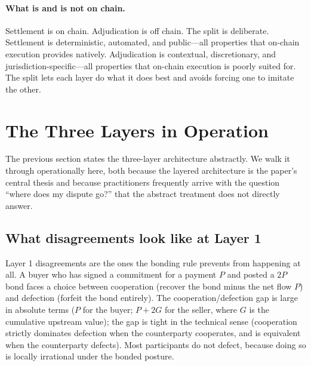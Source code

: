 \documentclass[11pt,a4paper]{article}
\theoremstyle{remark}
\begin{document}
\paragraph{What is and is not on chain.}
Settlement is on chain. Adjudication is off chain. The split is
deliberate. Settlement is deterministic, automated, and
public---all properties that on-chain execution provides natively.
Adjudication is contextual, discretionary, and
jurisdiction-specific---all properties that on-chain execution is
poorly suited for. The split lets each layer do what it does best
and avoids forcing one to imitate the other.

\section{The Three Layers in Operation}
\label{sec:three-layers-operation}

The previous section states the three-layer architecture
abstractly. We walk it through operationally here, both because
the layered architecture is the paper's central thesis and because
practitioners frequently arrive with the question ``where does my
dispute go?'' that the abstract treatment does not directly answer.

\subsection{What disagreements look like at Layer 1}

Layer 1 disagreements are the ones the bonding rule prevents from
happening at all. A buyer who has signed a commitment for a
payment $P$ and posted a $2P$ bond faces a choice between
cooperation (recover the bond minus the net flow $P$) and
defection (forfeit the bond entirely). The cooperation/defection
gap is large in absolute terms ($P$ for the buyer; $P + 2G$ for
the seller, where $G$ is the cumulative upstream value); the gap
is tight in the technical sense (cooperation strictly dominates
defection when the counterparty cooperates, and is equivalent
when the counterparty defects). Most participants do not defect,
because doing so is locally irrational under the bonded posture.
\end{document}
